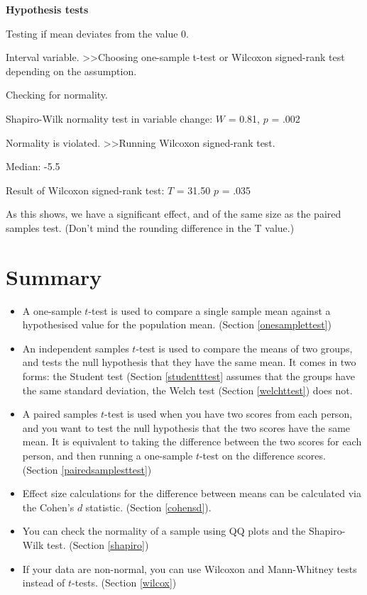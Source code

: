 \documentclass[
  11pt,
  a4paper,
  twoside,symmetric,openright]{book}
\providecommand{\tightlist}{%
  \setlength{\itemsep}{0pt}\setlength{\parskip}{0pt}}
\theoremstyle{break}
\theoremstyle{break}
\begin{document}
\begin{tcolorbox}[colback=white,
  colframe=lightgray,
  coltext=black,
  boxsep=4pt,
  boxrule=0.3pt,
  arc=0pt]
  {   \sffamily
      \color{CSblue}\textbf{Hypothesis tests}
      
      \color{CSgreen}Testing if mean deviates from the value 0.
      
      Interval variable. \textgreater\textgreater  Choosing one-sample t-test or Wilcoxon signed-rank test depending on the assumption.

      Checking for normality.

      \color{black}
      Shapiro-Wilk normality test in variable change: $W$ = 0.81, $p$ = .002

      \color{CSgreen}
      Normality is violated. \textgreater\textgreater Running Wilcoxon signed-rank test.

      \color{black}
      Median: -5.5

      Result of Wilcoxon signed-rank test: $T$ = 31.50 $p$ = .035
      \normalfont
  }
\end{tcolorbox}

As this shows, we have a significant effect, and of the same size as the paired samples test. (Don't mind the rounding difference in the T value.)

\section{Summary}\label{summary-7}

\begin{itemize}
\tightlist
\item
  A one-sample \(t\)-test is used to compare a single sample mean against a hypothesised value for the population mean. (Section \ref{onesamplettest})
\item
  An independent samples \(t\)-test is used to compare the means of two groups, and tests the null hypothesis that they have the same mean. It comes in two forms: the Student test (Section \ref{studentttest} assumes that the groups have the same standard deviation, the Welch test (Section \ref{welchttest}) does not.
\item
  A paired samples \(t\)-test is used when you have two scores from each person, and you want to test the null hypothesis that the two scores have the same mean. It is equivalent to taking the difference between the two scores for each person, and then running a one-sample \(t\)-test on the difference scores. (Section \ref{pairedsamplesttest})
\item
  Effect size calculations for the difference between means can be calculated via the Cohen's \(d\) statistic. (Section \ref{cohensd}).
\item
  You can check the normality of a sample using QQ plots and the Shapiro-Wilk test. (Section \ref{shapiro})
\item
  If your data are non-normal, you can use Wilcoxon and Mann-Whitney tests instead of \(t\)-tests. (Section \ref{wilcox})
\end{itemize}
\end{document}
